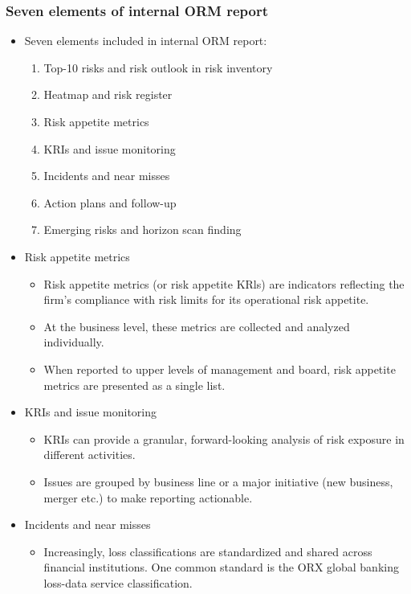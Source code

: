 \subsubsection{Seven elements of internal ORM report}
\begin{itemize}
\item Seven elements included in internal ORM report:
    \begin{enumerate}
    \item Top-10 risks and risk outlook in risk inventory
    \item Heatmap and risk register
    \item Risk appetite metrics
    \item KRIs and issue monitoring
    \item Incidents and near misses
    \item Action plans and follow-up
    \item Emerging risks and horizon scan finding
    \end{enumerate}
\item Risk appetite metrics
    \begin{itemize}
    \item Risk appetite metrics (or risk appetite KRls) are indicators reflecting the firm's compliance with risk limits for its operational risk appetite.
    \item At the business level, these metrics are collected and analyzed individually.
    \item When reported to upper levels of management and board, risk appetite metrics are presented as a single list.
    \end{itemize}
\item KRIs and issue monitoring
    \begin{itemize}
    \item KRIs can provide a granular, forward-looking analysis of risk exposure in different activities.
    \item Issues are grouped by business line or a major initiative (new business, merger etc.) to make reporting actionable.
    \end{itemize}
\item Incidents and near misses
    \begin{itemize}
    \item Increasingly, loss classifications are standardized and shared across financial institutions. One common standard is the ORX global banking loss-data service classification.
        \begin{itemize}

\end{itemize}
\end{itemize}
\end{itemize}
